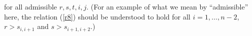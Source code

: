 \documentclass[twoside,12pt,reqno]{amsart}
\newtheorem{Remark}[Proposition]{Remark}
\begin{document}
for all admissible $r,s,t,i,j$.
(For an example of what we mean by ``admissible'' here, the relation (\ref{r8}) should be understood to hold for all
$i=1,\dots,n-2$, $r > s_{i,i+1}$ and $s > s_{i+1,i+2}$.)

\iffalse
\begin{Remark}\rm
The relations (\ref{r6}) are equivalent to
\begin{align}
[E_i^{(r)}, E_i^{(s+1)}] &- [E_i^{(r+1)}, E_i^{(s)}] =
E_i^{(r)} E_i^{(s)} + E_i^{(s)} E_i^{(r)},\label{r6p}\\\intertext{for all 
$i=1,\dots,n-1$ and
$r,s > s_{i,i+1}$, 
and the relations (\ref{r7}) are equivalent to}
[F_i^{(r+1)}, F_i^{(s)}] &- [F_i^{(r)}, F_i^{(s+1)}] =
F_i^{(r)} F_i^{(s)} + F_i^{(s)} F_i^{(r)},\label{r7p}
\end{align}
for all $i=1,\dots,n-1$ and $r,s > s_{i+1,i}$.
\end{Remark}
\fi
\end{document}
